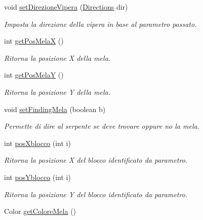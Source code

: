 \begin{DoxyCompactItemize}
void \mbox{\hyperlink{class_snake_1_1game_1_1utility_1_1game_manager_a6007259ace9d33bd56b9a6193e86df39}{set\+Direzione\+Vipera}} (\mbox{\hyperlink{enum_snake_1_1game_1_1utility_1_1_directions}{Directions}} dir)
\begin{DoxyCompactList}\small\item\em Imposta la direzione della vipera in base al parametro passato. \end{DoxyCompactList}\item 
int \mbox{\hyperlink{class_snake_1_1game_1_1utility_1_1game_manager_aae6590f1c2572c796a9ea154e3b16b27}{get\+Pos\+MelaX}} ()
\begin{DoxyCompactList}\small\item\em Ritorna la posizione X della mela. \end{DoxyCompactList}\item 
int \mbox{\hyperlink{class_snake_1_1game_1_1utility_1_1game_manager_ac23b89dc8711992dc3124c04888a1365}{get\+Pos\+MelaY}} ()
\begin{DoxyCompactList}\small\item\em Ritorna la posizione Y della mela. \end{DoxyCompactList}\item 
void \mbox{\hyperlink{class_snake_1_1game_1_1utility_1_1game_manager_a169584b55e994918baf671fe1c741e39}{set\+Finding\+Mela}} (boolean b)
\begin{DoxyCompactList}\small\item\em Permette di dire al serpente se deve trovare oppure no la mela. \end{DoxyCompactList}\item 
int \mbox{\hyperlink{class_snake_1_1game_1_1utility_1_1game_manager_a88318c562485640585510cbd35e76b07}{pos\+Xblocco}} (int i)
\begin{DoxyCompactList}\small\item\em Ritorna la posizione X del blocco identificato da parametro. \end{DoxyCompactList}\item 
int \mbox{\hyperlink{class_snake_1_1game_1_1utility_1_1game_manager_ac26b1474a291f2f7546e2e1cda1410b8}{pos\+Yblocco}} (int i)
\begin{DoxyCompactList}\small\item\em Ritorna la posizione Y del blocco identificato da parametro. \end{DoxyCompactList}\item 
Color \mbox{\hyperlink{class_snake_1_1game_1_1utility_1_1game_manager_a15fad4646c986312b476543b2f7e547a}{get\+Colore\+Mela}} ()

\end{DoxyCompactItemize}
